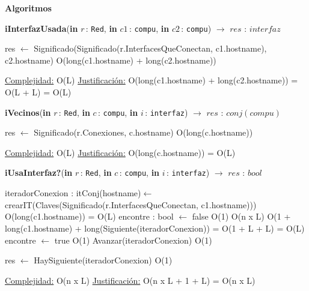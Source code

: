 \documentclass[a4paper,10pt]{article}
\let\TipoVariable=\texttt
\let\ModificadorArgumento=\textbf
\newcommand{\In}[2]{\ModificadorArgumento{in} \ensuremath{#1}\,: \TipoVariable{#2}\xspace}
\newenvironment{Algoritmos}{%
  \vspace*{2ex}%
  \noindent\textbf{\Large Algoritmos}%
  \vspace*{2ex}%
}{}
\begin{document}
\begin{Algoritmos}
\begin{algorithm}[H]{\textbf{iInterfazUsada}(\In {r}{Red}, \In {c1}{compu}, \In {c2}{compu}) $\to$ $res$ : $interfaz$} 
	\begin{algorithmic}
			\State res $\gets$ Significado(Significado(r.InterfacesQueConectan, c1.hostname), c2.hostname) 	\Comment O(long(c1.hostname) + long(c2.hostname))
			

			\medskip
			\Statex \underline{Complejidad:} O(L)
			\Statex \underline{Justificación:} O(long(c1.hostname) + long(c2.hostname)) = O(L + L) = O(L)
    	\end{algorithmic}
\end{algorithm}

\begin{algorithm}[H]{\textbf{iVecinos}(\In {r}{Red}, \In {c}{compu}, \In {i}{interfaz}) $\to$ $res$ : $conj(compu)$} 
	\begin{algorithmic}
			\State res $\gets$ Significado(r.Conexiones, c.hostname) 		   \Comment O(long(c.hostname))
			 
			\medskip
			\Statex \underline{Complejidad:} O(L)
			\Statex \underline{Justificación:} O(long(c.hostname)) = O(L)
    	\end{algorithmic}
\end{algorithm}

\begin{algorithm}[H]{\textbf{iUsaInterfaz?}(\In {r}{Red}, \In {c}{compu}, \In {i}{interfaz}) $\to$ $res$ : $bool$} 
	\begin{algorithmic}
			\State iteradorConexion : itConj(hostname)$\gets$ crearIT(Claves(Significado(r.InterfacesQueConectan, c1.hostname))) 	\Comment O(long(c1.hostname)) = O(L)
			\State encontre : bool $\gets$ false 		\Comment O(1)
			  \Comment O(n x L)
			   	\Comment O(1 + long(c1.hostname) + long(Siguiente(iteradorConexion)) = O(1 + L + L) = O(L)
			    \State encontre $\gets$ true 		\Comment O(1)
			  \EndIf
			  \State Avanzar(iteradorConexion) 					\Comment O(1)
			\EndWhile
			
			 \State res $\gets$ HaySiguiente(iteradorConexion)  			\Comment O(1)			 
			 
			\medskip
			\Statex \underline{Complejidad:} O(n x L)
			\Statex \underline{Justificación:} O(n x L + 1 + L) = O(n x L)
    	\end{algorithmic}
\end{algorithm}


\end{Algoritmos}
\end{document}
